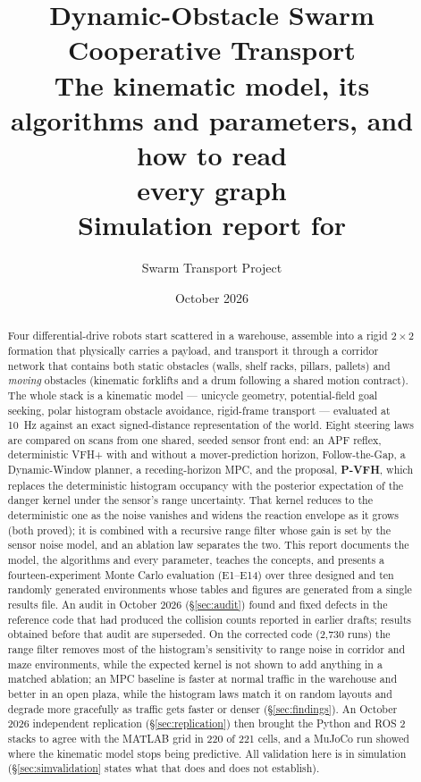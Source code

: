 \documentclass[11pt,a4paper]{article}
\title{\textbf{Dynamic-Obstacle Swarm Cooperative Transport}\\[4pt]
\large The kinematic model, its algorithms and parameters, and how to read\\every graph\\[6pt]
\normalsize Simulation report for \code{Simulation8_dynamic.m}}
\author{Swarm Transport Project}
\date{October 2026}
\begin{document}
\maketitle
\thispagestyle{empty}

\begin{abstract}
\noindent
Four differential-drive robots start scattered in a warehouse, assemble into a
rigid $2\times2$ formation that physically carries a payload, and transport it
through a corridor network that contains both static obstacles (walls, shelf
racks, pillars, pallets) and \emph{moving} obstacles (kinematic forklifts and
a drum following a shared motion contract). The whole stack is a kinematic
model --- unicycle geometry, potential-field goal seeking, polar histogram
obstacle avoidance, rigid-frame transport --- evaluated at 10~Hz against an
exact signed-distance representation of the world. Eight steering laws are
compared on scans from one shared, seeded sensor front end: an APF reflex,
deterministic VFH+ with and without a mover-prediction horizon,
Follow-the-Gap, a Dynamic-Window planner, a receding-horizon MPC, and the
proposal, \textbf{P-VFH},
which replaces the deterministic histogram occupancy with the posterior
expectation of the danger kernel under the sensor's range uncertainty. That
kernel reduces to the deterministic one as the noise vanishes and widens the
reaction envelope as it grows (both proved); it is combined with a recursive
range filter whose gain is set by the sensor noise model, and an ablation
law separates the two. This report documents the
model, the algorithms and every parameter, teaches the concepts, and
presents a fourteen-experiment Monte Carlo evaluation (E1--E14) over three
designed and ten randomly generated environments whose tables and figures are generated from a single results
file. An audit in October 2026 (\S\ref{sec:audit}) found and fixed defects
in the reference code that had produced the collision counts reported in
earlier drafts; results obtained before that audit are superseded. On the corrected code (2,730 runs) the range filter removes most of
the histogram's sensitivity to range noise in corridor and maze
environments, while the expected kernel is not shown to add anything in a
matched ablation; an MPC baseline is faster at normal traffic in the
warehouse and better in an open plaza, while the histogram laws match it
on random layouts and degrade more gracefully as traffic gets faster or
denser (\S\ref{sec:findings}). An October 2026 independent replication
(\S\ref{sec:replication}) then brought the Python and ROS 2 stacks to
agree with the MATLAB grid in 220 of 221 cells, and a MuJoCo run showed
where the kinematic model stops being predictive. All
validation here is in simulation (\S\ref{sec:simvalidation} states what
that does and does not establish).
\end{abstract}

\tableofcontents
\newpage













\end{document}
